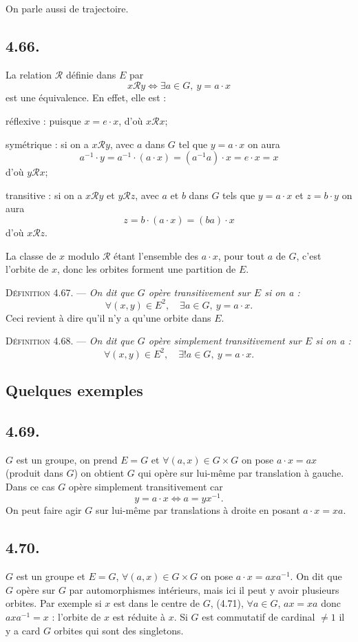 On parle aussi de trajectoire.

\subsection*{4.66.}
La relation $\mathcal R$ définie dans $E$ par
\[
x\mathcal R y\Longleftrightarrow \exists a\in G,\ y=a\cdot x
\]
est une équivalence. En effet, elle est :

réflexive : puisque $x=e\cdot x$, d'où $x\mathcal R x$;

symétrique : si on a $x\mathcal R y$, avec $a$ dans $G$ tel que $y=a\cdot x$ on aura
\[
a^{-1}\cdot y=a^{-1}\cdot(a\cdot x)=(a^{-1}a)\cdot x=e\cdot x=x
\]
d'où $y\mathcal R x$;

transitive : si on a $x\mathcal R y$ et $y\mathcal R z$, avec $a$ et $b$ dans $G$ tels que $y=a\cdot x$ et $z=b\cdot y$ on aura
\[
z=b\cdot(a\cdot x)=(ba)\cdot x
\]
d'où $x\mathcal R z$.

La classe de $x$ modulo $\mathcal R$ étant l'ensemble des $a\cdot x$, pour tout $a$ de $G$, c'est l'orbite de $x$, donc les orbites forment une partition de $E$.

\medskip\noindent\textsc{Définition 4.67.} --- \emph{On dit que $G$ opère transitivement sur $E$ si on a :
\[
\forall(x,y)\in E^2,\quad \exists a\in G,\ y=a\cdot x.
\]}
Ceci revient à dire qu'il n'y a qu'une orbite dans $E$.

\medskip\noindent\textsc{Définition 4.68.} --- \emph{On dit que $G$ opère simplement transitivement sur $E$ si on a :
\[
\forall(x,y)\in E^2,\quad \exists!a\in G,\ y=a\cdot x.
\]}

\subsection*{Quelques exemples}

\subsection*{4.69.}
$G$ est un groupe, on prend $E=G$ et $\forall(a,x)\in G\times G$ on pose $a\cdot x=ax$ (produit dans $G$) on obtient $G$ qui opère sur lui-même par translation à gauche. Dans ce cas $G$ opère simplement transitivement car
\[
y=a\cdot x\Longleftrightarrow a=yx^{-1}.
\]
On peut faire agir $G$ sur lui-même par translations à droite en posant $a\cdot x=xa$.

\subsection*{4.70.}
$G$ est un groupe et $E=G$, $\forall(a,x)\in G\times G$ on pose $a\cdot x=axa^{-1}$.
On dit que $G$ opère sur $G$ par automorphismes intérieurs, mais ici il peut y avoir plusieurs orbites. Par exemple si $x$ est dans le centre de $G$, (4.71), $\forall a\in G$, $ax=xa$ donc $axa^{-1}=x$ : l'orbite de $x$ est réduite à $x$. Si $G$ est commutatif de cardinal $\ne1$ il y a card $G$ orbites qui sont des singletons.

